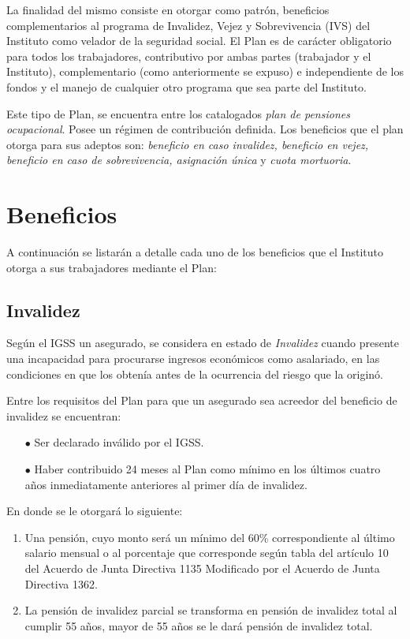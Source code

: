 \documentclass[12pt,letterpaper,titlepage]{article}
\begin{document}
La finalidad del mismo consiste en otorgar como patrón, beneficios complementarios al programa de Invalidez, Vejez y Sobrevivencia (IVS) del Instituto como velador de la seguridad social. El Plan es de carácter obligatorio para todos los trabajadores, contributivo por ambas partes (trabajador y el Instituto), complementario (como anteriormente se expuso) e independiente de los fondos y el manejo de cualquier otro programa que sea parte del Instituto.

Este tipo de Plan, se encuentra entre los catalogados \textit{plan de pensiones ocupacional}. Posee un régimen de contribución definida. Los beneficios que el plan otorga para sus adeptos son: \textit{beneficio en caso invalidez, beneficio en vejez, beneficio en caso de sobrevivencia, asignación única} y \textit{cuota mortuoria}.

\newpage
\section{Beneficios}

A continuación se listarán a detalle cada uno de los beneficios que el Instituto otorga a sus trabajadores mediante el Plan:

\subsection{Invalidez}

Según el IGSS un asegurado, se considera en estado de \textit{Invalidez} cuando presente una incapacidad para procurarse ingresos económicos como asalariado, en las condiciones en que los obtenía antes de la ocurrencia del riesgo que la originó. 

Entre los requisitos del Plan para que un asegurado sea acreedor del beneficio de invalidez se encuentran:
\begin{itemize}
	\item [$\bullet$] Ser declarado inválido por el IGSS.
	\item [$\bullet$] Haber contribuido 24 meses al Plan como mínimo en los últimos cuatro años inmediatamente anteriores al primer día de invalidez.
\end{itemize}

En donde se le otorgará lo siguiente:
\begin{enumerate}
	\item Una pensión, cuyo monto será un mínimo del 60\% correspondiente al último salario mensual o al porcentaje que corresponde según tabla del artículo 10 del Acuerdo de Junta Directiva 1135 Modificado por el Acuerdo de Junta Directiva 1362.
	\item La pensión de invalidez parcial se transforma en pensión de invalidez total al cumplir 55 años, mayor de 55 años se le dará pensión de invalidez total.
\end{enumerate}
\end{document}

